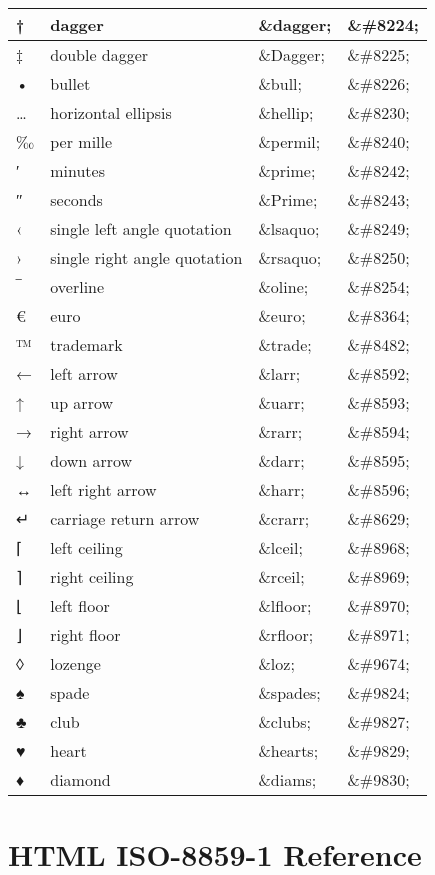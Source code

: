 \begin{longtable}{|l|l|l|l|}
\hline
†	&dagger							&\&dagger;	&\&\#8224;\\
\hline
‡	&double dagger					&\&Dagger;	&\&\#8225;\\
\hline
•	&bullet							&\&bull;		&\&\#8226;\\
\hline
…	&horizontal ellipsis				&\&hellip;	&\&\#8230;\\
\hline
‰	&per mille 						&\&permil;	&\&\#8240;\\
\hline
′	&minutes							&\&prime;	&\&\#8242;\\
\hline
″	&seconds						&\&Prime;	&\&\#8243;\\
\hline
‹	&single left angle quotation			&\&lsaquo;	&\&\#8249;\\
\hline
›	&single right angle quotation			&\&rsaquo;	&\&\#8250;\\
\hline
‾	&overline						&\&oline;		&\&\#8254;\\
\hline
€	&euro							&\&euro;		&\&\#8364;\\
\hline
™	&trademark						&\&trade;	&\&\#8482;\\
\hline
←	&left arrow						&\&larr;		&\&\#8592;\\
\hline
↑	&up arrow						&\&uarr;		&\&\#8593;\\
\hline
→	&right arrow						&\&rarr;		&\&\#8594;\\
\hline
↓	&down arrow						&\&darr;		&\&\#8595;\\
\hline
↔	&left right arrow					&\&harr;		&\&\#8596;\\
\hline
↵	&carriage return arrow				&\&crarr;		&\&\#8629;\\
\hline
⌈	&left ceiling						&\&lceil;		&\&\#8968;\\
\hline
⌉	&right ceiling						&\&rceil;		&\&\#8969;\\
\hline
⌊	&left floor						&\&lfloor;	&\&\#8970;\\
\hline
⌋	&right floor						&\&rfloor;	&\&\#8971;\\
\hline
◊	&lozenge						&\&loz;		&\&\#9674;\\
\hline
♠	&spade							&\&spades;	&\&\#9824;\\
\hline
♣	&club							&\&clubs;	&\&\#9827;\\
\hline
♥	&heart							&\&hearts;	&\&\#9829;\\
\hline
♦	&diamond						&\&diams;	&\&\#9830;\\
\hline

\end{longtable}

\chapter{HTML ISO-8859-1 Reference}

